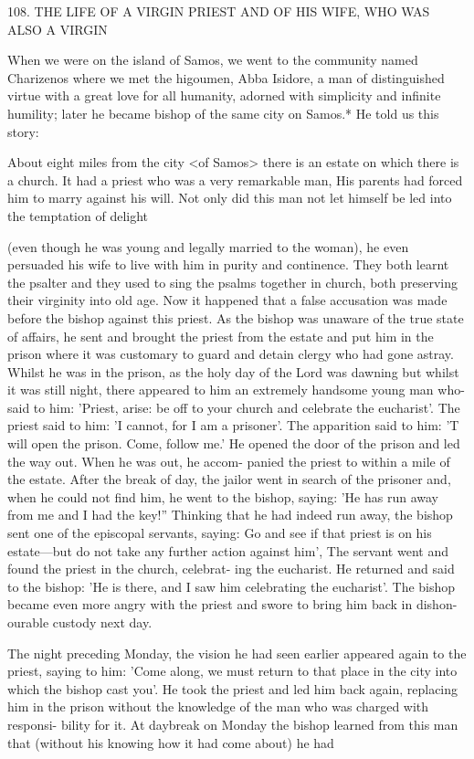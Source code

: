 108.
THE LIFE OF A VIRGIN PRIEST AND OF
HIS WIFE, WHO WAS ALSO A VIRGIN

When we were on the island of Samos, we went to the community
named Charizenos where we met the higoumen, Abba Isidore, a
man of distinguished virtue with a great love for all humanity,
adorned with simplicity and infinite humility; later he became
bishop of the same city on Samos.* He told us this story:

About eight miles from the city <of Samos> there is an estate on
which there is a church.
It had a priest who was a very remarkable
man, His parents had forced him to marry against his will.
Not only
did this man not let himself be led into the temptation of delight

(even though he was young and legally married to the woman), he
even persuaded his wife to live with him in purity and continence.
They both learnt the psalter and they used to sing the psalms
together in church, both preserving their virginity into old age.
Now
it happened that a false accusation was made before the bishop
against this priest.
As the bishop was unaware of the true state of
affairs, he sent and brought the priest from the estate and put him
in the prison where it was customary to guard and detain clergy
who had gone astray.
Whilst he was in the prison, as the holy day
of the Lord was dawning but whilst it was still night, there appeared
to him an extremely handsome young man who-said to him: 'Priest,
arise: be off to your church and celebrate the eucharist'.
The priest
said to him: 'I cannot, for I am a prisoner'.
The apparition said to
him: 'T will open the prison.
Come, follow me.' He opened the door
of the prison and led the way out.
When he was out, he accom-
panied the priest to within a mile of the estate.
After the break of
day, the jailor went in search of the prisoner and, when he could
not find him, he went to the bishop, saying: 'He has run away from
me and I had the key!” Thinking that he had indeed run away, the
bishop sent one of the episcopal servants, saying: \textquotesingle Go and see if that
priest is on his estate—but do not take any further action against
him', The servant went and found the priest in the church, celebrat-
ing the eucharist.
He returned and said to the bishop: 'He is there,
and I saw him celebrating the eucharist'.
The bishop became even
more angry with the priest and swore to bring him back in dishon-
ourable custody next day.

The night preceding Monday, the vision he had seen earlier
appeared again to the priest, saying to him: 'Come along, we must
return to that place in the city into which the bishop cast you'.
He
took the priest and led him back again, replacing him in the prison
without the knowledge of the man who was charged with responsi-
bility for it.
At daybreak on Monday the bishop learned from this
man that (without his knowing how it had come about) he had

